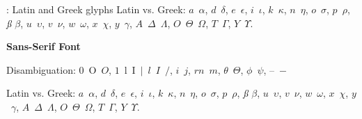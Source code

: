 \documentclass[aspectratio = 169, t, 10pt]{beamer}
\begin{document}
\begin{frame}[allowframebreaks]{\insertsection: Latin and Greek glyphs}
{Latin vs. Greek: $a$~$\alpha$, $d$~$\delta$, $e$~$\epsilon$, $i$~$\iota$, $k$~$\kappa$, $n$~$\eta$, $o$~$\sigma$, $p$~$\rho$, \textit{\ss} $\beta$, $u$~$\upsilon$, $v$~$\nu$, $w$~$\omega$, $x$~$\chi$, $y$~$\gamma$, $A$~$\Delta$~$\Lambda$, $O$~$\Theta$~$\Omega$, $T$~$\Gamma$, $Y$~$\Upsilon$.
}

\smallskip
\textbf{Sans-Serif Font}
\smallskip

Disambiguation: $0$~O~$O$, $1$~l~I~$|$~$l$~$I$~$/$, $i$~$j$, $rn$~$m$, $\theta$~$\Theta$, $\phi$~$\psi$, --~$-$

Latin vs. Greek: $a$~$\alpha$, $d$~$\delta$, $e$~$\epsilon$, $i$~$\iota$, $k$~$\kappa$, $n$~$\eta$, $o$~$\sigma$, $p$~$\rho$, \textit{\ss} $\beta$, $u$~$\upsilon$, $v$~$\nu$, $w$~$\omega$, $x$~$\chi$, $y$~$\gamma$, $A$~$\Delta$~$\Lambda$, $O$~$\Theta$~$\Omega$, $T$~$\Gamma$, $Y$~$\Upsilon$.

\end{frame}


\newcommand\ibinom[2]{\genfrac\lbrace\rbrace{0pt}{}{#1}{#2}}
\end{document}

